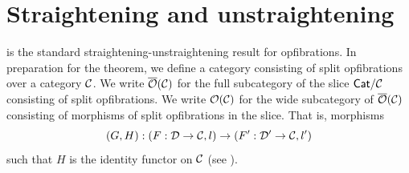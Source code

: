 \section*{Straightening and unstraightening}

 is the standard straightening-unstraightening result
for opfibrations.
In preparation for the theorem,
we define a category consisting of
split opfibrations over a category $\mathcal{C}$.
We write ${\overline{{\mathcal{O}}}}(\mathcal{C})$ for the full subcategory of the slice
$\mathsf{Cat} / \mathcal{C}$ consisting of split opfibrations.
We write ${\mathcal{O}}(\mathcal{C})$ for
the wide subcategory of ${\overline{{\mathcal{O}}}}(\mathcal{C})$
consisting of morphisms of split opfibrations in the slice.
That is, morphisms
\[(G,H) : (F : \mathcal{D} \to \mathcal{C}, l) \to (F' : \mathcal{D}' \to \mathcal{C}, l')\]
such that $H$ is the identity functor on $\mathcal{C}$
(see \cite[Definition 3.1]{streicher2018}).



